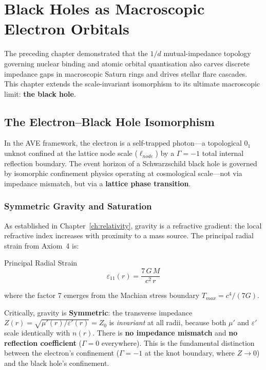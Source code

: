 \chapter{Black Holes as Macroscopic Electron Orbitals}
\label{ch:bh_orbitals}

The preceding chapter demonstrated that the $1/d$ mutual-impedance topology governing nuclear binding and atomic orbital quantisation also carves discrete impedance gaps in macroscopic Saturn rings and drives stellar flare cascades. This chapter extends the scale-invariant isomorphism to its ultimate macroscopic limit: \textbf{the black hole}.

\section{The Electron--Black Hole Isomorphism}

In the AVE framework, the electron is a self-trapped photon---a topological $0_1$ unknot confined at the lattice node scale ($\ell_{node}$) by a $\Gamma = -1$ total internal reflection boundary. The event horizon of a Schwarzschild black hole is governed by isomorphic confinement physics operating at cosmological scale---not via impedance mismatch, but via a \textbf{lattice phase transition}.

\subsection{Symmetric Gravity and Saturation}

As established in Chapter~\ref{ch:relativity}, gravity is a refractive gradient: the local refractive index increases with proximity to a mass source. The principal radial strain from Axiom~4 is:
\begin{resultbox}{Principal Radial Strain}
\begin{equation}
    \varepsilon_{11}(r) = \frac{7\,G\,M}{c^2\,r}
\end{equation}
\end{resultbox}
where the factor 7 emerges from the Machian stress boundary $T_{max} = c^4/(7G)$.

Critically, gravity is \textbf{Symmetric}: the transverse impedance $Z(r) = \sqrt{\mu'(r)/\varepsilon'(r)} = Z_0$ is \textit{invariant} at all radii, because both $\mu'$ and $\varepsilon'$ scale identically with $n(r)$. There is \textbf{no impedance mismatch} and \textbf{no reflection coefficient} ($\Gamma = 0$ everywhere). This is the fundamental distinction between the electron's confinement ($\Gamma = -1$ at the knot boundary, where $Z \to 0$) and the black hole's confinement.

